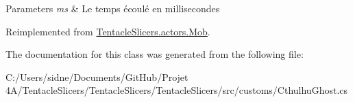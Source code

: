 \begin{DoxyParams}{Parameters}
{\em ms} & Le temps écoulé en millisecondes \\
\hline
\end{DoxyParams}


Reimplemented from \hyperlink{class_tentacle_slicers_1_1actors_1_1_mob_ad3e79cfdf2a28f8eb6363f0567bdcaaf}{Tentacle\+Slicers.\+actors.\+Mob}.



The documentation for this class was generated from the following file\+:\begin{DoxyCompactItemize}
\item 
C\+:/\+Users/sidne/\+Documents/\+Git\+Hub/\+Projet 4\+A/\+Tentacle\+Slicers/\+Tentacle\+Slicers/\+Tentacle\+Slicers/src/customs/Cthulhu\+Ghost.\+cs\end{DoxyCompactItemize}
